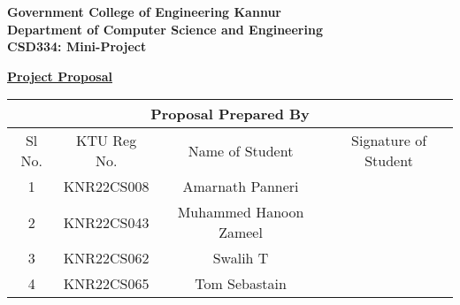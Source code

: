 \documentclass[14pt]{article}
\begin{document}
\begin{center}
\large{\textbf{Government College of Engineering Kannur\\}}
\large{\textbf{Department of Computer Science and Engineering\\}}
\large{\textbf{CSD334: Mini-Project\\}}
\end{center}

\begin{center}
\small{\textbf{\underline{ Project Proposal}\\}}
\end{center}

\begin{table}[ht!]
\begin{center}
\begin{tabular}{|cccc|}
\hline
\multicolumn{4}{|c|}{\textbf{Proposal Prepared By}}                        \\ \hline
\multicolumn{1}{|c|}{Sl No.} & \multicolumn{1}{c|}{KTU Reg No.} & \multicolumn{1}{c|}{Name of Student}              & Signature of Student \\ \hline
\multicolumn{1}{|c|}{1}      & \multicolumn{1}{c|}{KNR22CS008}   & \multicolumn{1}{c|}{Amarnath Panneri} &           \\ \hline
\multicolumn{1}{|c|}{2} & \multicolumn{1}{c|}{KNR22CS043} & \multicolumn{1}{c|}{Muhammed Hanoon Zameel} &  \\ \hline
\multicolumn{1}{|c|}{3} & \multicolumn{1}{c|}{KNR22CS062} & \multicolumn{1}{c|}{Swalih T} &  \\ \hline
\multicolumn{1}{|c|}{4} & \multicolumn{1}{c|}{KNR22CS065} & \multicolumn{1}{c|}{Tom Sebastain} &  \\ \hline
\end{tabular}
\end{center}
\end{table}
\end{document}
